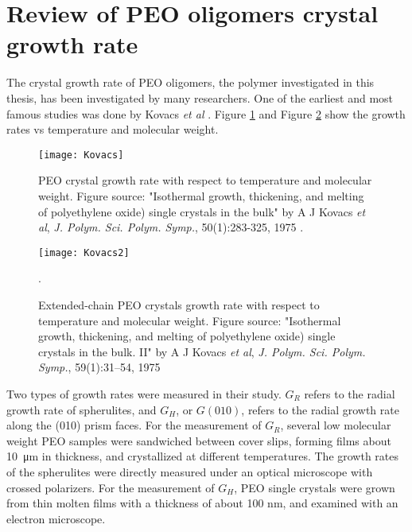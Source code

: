 \section{Review of PEO oligomers crystal growth rate}

The crystal growth rate of PEO oligomers, the polymer investigated in this thesis, has been investigated by many researchers. One of the earliest and most famous studies was done by Kovacs \textit{et al} \cite{Kovacs1975}. Figure \ref{fig:Kovacs} and Figure \ref{fig:Kovacs2} show the growth rates vs temperature and molecular weight. 

\begin{figure}[H]
\center
\texttt{[image: Kovacs]}
\caption[PEO crystal growth rate with respect to temperature and molecular weight.]{PEO crystal growth rate with respect to temperature and molecular weight. Figure source: "Isothermal growth, thickening, and melting of polyethylene oxide) single crystals in the bulk" by A J Kovacs \textit{et al}, \textit{J. Polym. Sci. Polym. Symp.}, 50(1):283-325, 1975 \cite{Kovacs1975}.}
\label{fig:Kovacs}
\end{figure}

\begin{figure}[H]
\center
\texttt{[image: Kovacs2]}
\caption[Extended-chain PEO crystals growth rate with respect to temperature and molecular weight.]{Extended-chain PEO crystals growth rate with respect to temperature and molecular weight. Figure source: "Isothermal growth, thickening, and melting of polyethylene oxide) single crystals in the bulk. II" by A J Kovacs \textit{et al}, \textit{J. Polym. Sci. Polym. Symp.}, 59(1):31–54, 1975 \cite{Kovacs1977}}.
\label{fig:Kovacs2}
\end{figure}

Two types of growth rates were measured in their study. $G_{R}$ refers to the radial growth rate of spherulites, and $G_{H}$, or $G(010)$, refers to the radial growth rate along the (010) prism faces. For the measurement of $G_{R}$, several low molecular weight PEO samples were sandwiched between cover slips, forming films about \SI{10}{\micro\metre} in thickness, and crystallized at different temperatures. The growth rates of the spherulites were directly measured under an optical microscope with crossed polarizers. For the measurement of $G_{H}$, PEO single crystals were grown from thin molten films with a thickness of about 100 nm, and examined with an electron microscope.

